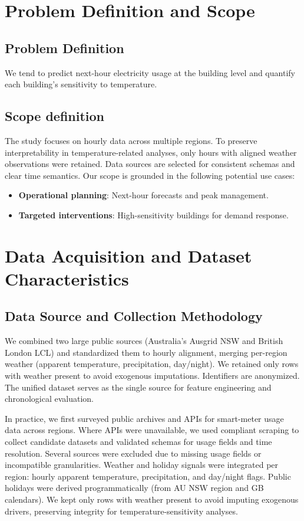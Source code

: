 \documentclass[11pt,a4paper]{article}
\begin{document}
\section{Problem Definition and Scope}

\subsection{Problem Definition}
We tend to  predict next-hour electricity usage at the building level and quantify each building's sensitivity to temperature.

\subsection{Scope definition}
The study focuses on hourly data across multiple regions. To preserve interpretability in temperature-related analyses, only hours with aligned weather observations were retained. Data sources are selected for consistent schemas and clear time semantics. Our scope is grounded in the following potential use cases:
\begin{itemize}[leftmargin=*]
  \item \textbf{Operational planning}: Next-hour forecasts and peak management.
  \item \textbf{Targeted interventions}: High-sensitivity buildings for demand response.
\end{itemize}

\section{Data Acquisition and Dataset Characteristics}

\subsection{Data Source and Collection Methodology}
We combined two large public sources (Australia's Ausgrid NSW and British London LCL) and standardized them to hourly alignment, merging per-region weather (apparent temperature, precipitation, day/night). We retained only rows with weather present to avoid exogenous imputations. Identifiers are anonymized. The unified dataset serves as the single source for feature engineering and chronological evaluation.

In practice, we first surveyed public archives and APIs for smart-meter usage data across regions. Where APIs were unavailable, we used compliant scraping to collect candidate datasets and validated schemas for usage fields and time resolution. Several sources were excluded due to missing usage fields or incompatible granularities. Weather and holiday signals were integrated per region: hourly apparent temperature, precipitation, and day/night flags. Public holidays were derived programmatically (from AU NSW region and GB calendars). We kept only rows with weather present to avoid imputing exogenous drivers, preserving integrity for temperature-sensitivity analyses.
\end{document}
